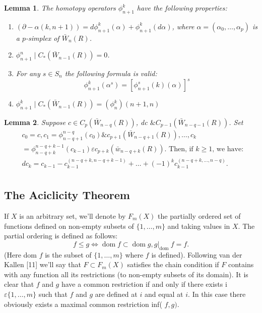 \documentclass{book}
\newtheorem{lemm}{Lemma}
\begin{document}
\begin{lemm}
The homotopy operators $\phi_{n+1}^k$ have the following properties:
    \begin{enumerate}
        \item $(\partial - \alpha(k, n+1))=d \phi_{n+1}^k(\alpha)+\phi_{n+1}^k(d \alpha)$, where $\alpha=\left(\alpha_0, \ldots, \alpha_p\right)$ is a $p$-simplex of $\bar{W}_n(R)$.
        \item $\phi_{n+1}^n \mid C_*\left(\bar{W}_{n-1}(R)\right)=0$.
        \item For any $s \in S_n$ the following formula is valid:
        $$
        \phi_{n+1}^k\left(\alpha^s\right)=\left[\phi_{n+1}^s(k)(\alpha)\right]^s
        $$
        \item $\phi_{n+1}^k \mid C_*\left(\bar{W}_{n-1}(R)\right)=\left(\phi_n^k\right)(n+1, n)$   
    \end{enumerate}
\end{lemm}

\begin{lemm}
Suppose $c \in C_p\left(\bar{W}_{n-q}(R)\right)$, dc $\& C_{p-1}\left(\bar{W}_{n-q-1}(R)\right)$. Set
    $$
    \begin{aligned}
    & c_0=c, c_1=\phi_{n-q+1}^{n-q}\left(c_0\right) \& c_{p+1}\left(\bar{W}_{n-q+1}(R)\right), \ldots, c_k \\
    & =\phi_{n-q+k}^{n-q+k-1}\left(c_{k-1}\right) \varepsilon c_{p+k}\left(\bar{w}_{n-q+k}(R)\right) \text {. Then, if } k \geq 1 \text {, we have: } \\
    & d c_k=c_{k-1}-c_{k-1}^{(n-q+k, n-q+k-1)}+\ldots+(-1)^k c_{k-1}^{(n-q+k, \ldots, n-q)} . \\
    &
    \end{aligned}$$
\end{lemm}


\subsection{The Aciclicity Theorem}

If $X$ is an arbitrary set, we'll denote by $F_m(X)$ the partially ordered set of functions defined on non-empty subsets of $\{1, \ldots, m\}$ and taking values in $X$. The partial ordering is defined as follows:
$$
f \leq g \Leftrightarrow \operatorname{dom} f \subset \operatorname{dom} g,\left.g\right|_{\text {dom }} f=f .
$$
(Here dom $f$ is the subset of $\{1, \ldots, m\}$ where $f$ is defined). Following van der Kallen [11] we'll say that $F \subset F_m(X)$ satisfies the chain condition if $F$ contains with any function all its restrictions (to non-empty subsets of its domain). It is clear that $f$ and $g$ have a common restriction if and only if there exists i $\varepsilon\{1, \ldots, m\}$ such that $f$ and $g$ are defined at $i$ and equal at $i$. In this case there obviously exists a maximal common restriction inf( $f, g)$.
\end{document}
